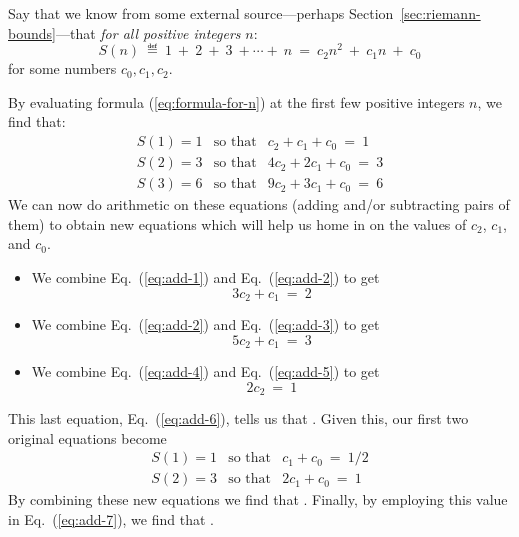 \medskip

Say that we know from some external source---perhaps 
Section~\ref{sec:riemann-bounds}---that {\em for all positive integers} $n$:
\begin{equation}
\label{eq:formula-for-n}
S(n) \ \eqdef \
 1 \ + \ 2 \ + \ 3 \ + \cdots + \ n 
         \ = \ 
c_2 n^2 \ + \ c_1 n \ + \ c_0
\end{equation}
for some numbers $c_0, c_1, c_2$.

\medskip

\noindent By evaluating formula (\ref{eq:formula-for-n}) at the first few positive integers $n$, we find that:
\begin{eqnarray}
\label{eq:add-1}
S(1) = 1
 & \mbox{so that} &
 c_2 + c_1 + c_0 \ = \ 1 \\
\label{eq:add-2}
S(2) = 3
 & \mbox{so that} &
 4 c_2 + 2 c_1 + c_0 \ = \ 3 \\
\label{eq:add-3}
S(3) = 6
 & \mbox{so that} &
 9 c_2 + 3 c_1 + c_0 \ = \ 6
\end{eqnarray}
We can now do arithmetic on these equations (adding and/or subtracting pairs of them) to obtain new equations which will help us home in on the values of $c_2$, $c_1$, and $c_0$.
\begin{itemize}
\item
We combine Eq.~(\ref{eq:add-1}) and Eq.~(\ref{eq:add-2}) to get
\begin{equation}
\label{eq:add-4}
3c_2 + c_1 \ = \ 2
\end{equation}

\medskip\item
We combine Eq.~(\ref{eq:add-2}) and Eq.~(\ref{eq:add-3}) to get
\begin{equation}
\label{eq:add-5}
5 c_2 + c_1 \ = \ 3
\end{equation}

\medskip\item
We combine Eq.~(\ref{eq:add-4}) and Eq.~(\ref{eq:add-5}) to get
\begin{equation}
\label{eq:add-6}
2 c_2 \ = \ 1
\end{equation}
\end{itemize}
This last equation, Eq.~(\ref{eq:add-6}), tells us that .  Given this, our first two original equations become
\begin{eqnarray}
\label{eq:add-7}
S(1) = 1
 & \mbox{so that} &
c_1 + c_0 \ = \ 1/2 \\
\label{eq:add-8}
S(2) = 3
 & \mbox{so that} &
2 c_1 + c_0 \ = \ 1
\end{eqnarray}
By combining these new equations we find that .  Finally, by employing this value in Eq.~(\ref{eq:add-7}), we find that .

